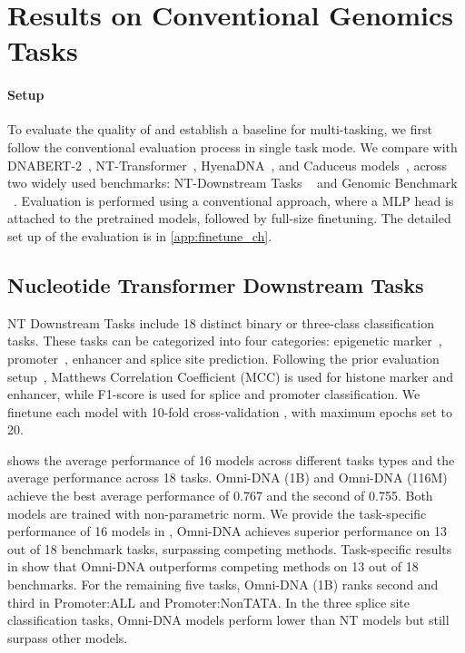 \section{Results on Conventional Genomics Tasks}
\label{sec:fullfinetune}
\paragraph{Setup} To evaluate the quality of \method and establish a baseline for multi-tasking, we first follow the conventional evaluation process in single task mode. We compare \method with DNABERT-2~\cite{zhou2023dnabert}, NT-Transformer~\cite{dalla2024nucleotide}, HyenaDNA~\cite{nguyen2024hyenadna}, and Caduceus models~\cite{schiff2024caduceus}, across two widely used benchmarks: NT-Downstream Tasks ~\cite{dalla2024nucleotide} and  Genomic Benchmark ~\cite{grevsova2023genomic}. Evaluation is performed using a conventional approach, where a MLP head is attached to the pretrained models, followed by full-size finetuning. The detailed set up of the evaluation is in \cref{app:finetune_ch}.


\subsection{Nucleotide Transformer Downstream Tasks}
\label{sec:nt_classification}

NT Downstream Tasks include 18 distinct binary or three-class classification tasks. These tasks can be categorized into four categories: epigenetic marker~\cite{pokholok2005genome},  promoter~\citep{oubounyt2019deepromoter}, enhancer and splice site prediction. Following the prior evaluation setup~\cite{schiff2024caduceus}, Matthews Correlation Coefficient (MCC) is used for histone marker and enhancer, while F1-score is used for splice and promoter classification. We finetune each model with 10-fold cross-validation \cite{schiff2024caduceus}, with maximum epochs set to 20.

 shows the average performance of 16 models across different tasks types and the average performance across 18 tasks. Omni-DNA (1B) and Omni-DNA (116M) achieve the best average performance of 0.767 and the second of 0.755. Both models are trained with non-parametric norm. We provide the task-specific performance of 16 models in , Omni-DNA achieves superior performance on 13 out of 18 benchmark tasks, surpassing competing methods. Task-specific results in  show that Omni-DNA outperforms competing methods on 13 out of 18 benchmarks. For the remaining five tasks, Omni-DNA (1B) ranks second and third in Promoter:ALL and Promoter:NonTATA. In the three splice site classification tasks, Omni-DNA models perform lower than NT models but still surpass other models.

